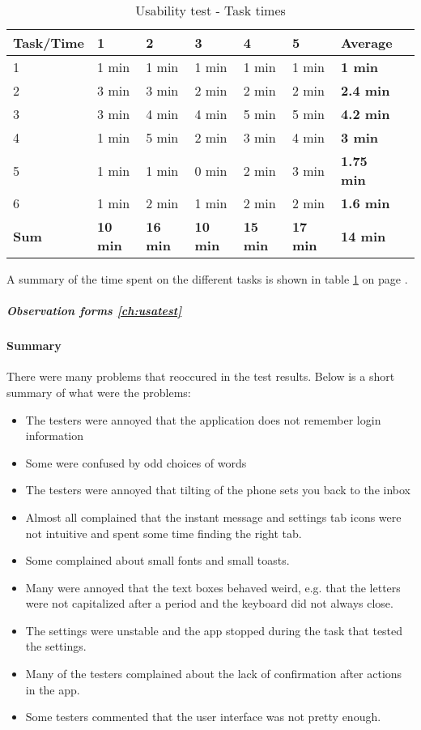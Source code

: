 				\begin{table}[h!]
\begin{center}
			\begin{tabular}{l|l|l|l|l|l|l|l}	\hline
				\textbf{Task/Time}&\textbf{1}&\textbf{2}&\textbf{3}&\textbf{4}&\textbf{5}&\textbf{Average}\\ \hline \hline
				1&1 min&1 min&1 min&1 min&1 min&\textbf{1 min}\\ \hline
				2&3 min&3 min&2 min&2 min&2 min&\textbf{2.4 min}\\ \hline
				3&3 min&4 min&4 min&5 min&5 min&\textbf{4.2 min}\\ \hline
				4&1 min&5 min&2 min&3 min&4 min&\textbf{3 min}\\ \hline
				5&1 min&1 min&0 min&2 min&3 min&\textbf{1.75 min}\\ \hline
				6&1 min&2 min&1 min&2 min&2 min&\textbf{1.6 min}\\ \hline
				\textbf{Sum}&\textbf{10 min}&\textbf{16 min}&\textbf{10 min}&\textbf{15 min}&\textbf{17 min}&\textbf{14 min}\\ \hline 
				
			\end{tabular}
\end{center}
			\caption{Usability test - Task times} \label{tab:usabilitytasktime}
		\end{table}
			A summary of the time spent on the different tasks is shown in table \ref{tab:usabilitytasktime} on page \pageref{tab:usabilitytasktime}.
			\subparagraph{Observation forms \ref{ch:usatest}}\hfill
\newline
		\paragraph{Summary}\hfill
\newline
			There were many problems that reoccured in the test results. Below is a short summary of what were the problems:
			\begin{itemize}
				\item{}The testers were annoyed that the application does not remember login information
				\item{}Some were confused by odd choices of words
				\item{}The testers were annoyed that tilting of the phone sets you back to the inbox
				\item{}Almost all complained that the instant message and settings tab icons were not intuitive and spent some time finding the right tab.
				\item{}Some complained about small fonts and small toasts.
				\item{}Many were annoyed that the text boxes behaved weird, e.g. that the letters were not capitalized after a period and the keyboard did not always close. 
				\item{}The settings were unstable and the app stopped during the task that tested the settings.
				\item{}Many of the testers complained about the lack of confirmation after actions in the app.
				\item{}Some testers commented that the user interface was not pretty enough.
			\end{itemize}
